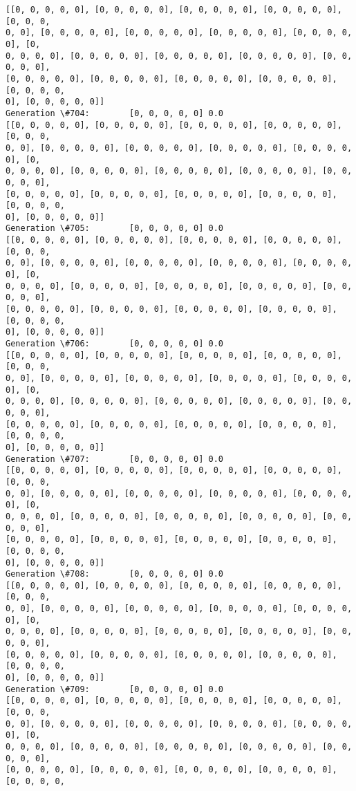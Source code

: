 \documentclass[11pt]{article}
\begin{document}
\begin{Verbatim}[commandchars=\\\{\}]
[[0, 0, 0, 0, 0], [0, 0, 0, 0, 0], [0, 0, 0, 0, 0], [0, 0, 0, 0, 0], [0, 0, 0,
0, 0], [0, 0, 0, 0, 0], [0, 0, 0, 0, 0], [0, 0, 0, 0, 0], [0, 0, 0, 0, 0], [0,
0, 0, 0, 0], [0, 0, 0, 0, 0], [0, 0, 0, 0, 0], [0, 0, 0, 0, 0], [0, 0, 0, 0, 0],
[0, 0, 0, 0, 0], [0, 0, 0, 0, 0], [0, 0, 0, 0, 0], [0, 0, 0, 0, 0], [0, 0, 0, 0,
0], [0, 0, 0, 0, 0]]
Generation \#704:        [0, 0, 0, 0, 0] 0.0
[[0, 0, 0, 0, 0], [0, 0, 0, 0, 0], [0, 0, 0, 0, 0], [0, 0, 0, 0, 0], [0, 0, 0,
0, 0], [0, 0, 0, 0, 0], [0, 0, 0, 0, 0], [0, 0, 0, 0, 0], [0, 0, 0, 0, 0], [0,
0, 0, 0, 0], [0, 0, 0, 0, 0], [0, 0, 0, 0, 0], [0, 0, 0, 0, 0], [0, 0, 0, 0, 0],
[0, 0, 0, 0, 0], [0, 0, 0, 0, 0], [0, 0, 0, 0, 0], [0, 0, 0, 0, 0], [0, 0, 0, 0,
0], [0, 0, 0, 0, 0]]
Generation \#705:        [0, 0, 0, 0, 0] 0.0
[[0, 0, 0, 0, 0], [0, 0, 0, 0, 0], [0, 0, 0, 0, 0], [0, 0, 0, 0, 0], [0, 0, 0,
0, 0], [0, 0, 0, 0, 0], [0, 0, 0, 0, 0], [0, 0, 0, 0, 0], [0, 0, 0, 0, 0], [0,
0, 0, 0, 0], [0, 0, 0, 0, 0], [0, 0, 0, 0, 0], [0, 0, 0, 0, 0], [0, 0, 0, 0, 0],
[0, 0, 0, 0, 0], [0, 0, 0, 0, 0], [0, 0, 0, 0, 0], [0, 0, 0, 0, 0], [0, 0, 0, 0,
0], [0, 0, 0, 0, 0]]
Generation \#706:        [0, 0, 0, 0, 0] 0.0
[[0, 0, 0, 0, 0], [0, 0, 0, 0, 0], [0, 0, 0, 0, 0], [0, 0, 0, 0, 0], [0, 0, 0,
0, 0], [0, 0, 0, 0, 0], [0, 0, 0, 0, 0], [0, 0, 0, 0, 0], [0, 0, 0, 0, 0], [0,
0, 0, 0, 0], [0, 0, 0, 0, 0], [0, 0, 0, 0, 0], [0, 0, 0, 0, 0], [0, 0, 0, 0, 0],
[0, 0, 0, 0, 0], [0, 0, 0, 0, 0], [0, 0, 0, 0, 0], [0, 0, 0, 0, 0], [0, 0, 0, 0,
0], [0, 0, 0, 0, 0]]
Generation \#707:        [0, 0, 0, 0, 0] 0.0
[[0, 0, 0, 0, 0], [0, 0, 0, 0, 0], [0, 0, 0, 0, 0], [0, 0, 0, 0, 0], [0, 0, 0,
0, 0], [0, 0, 0, 0, 0], [0, 0, 0, 0, 0], [0, 0, 0, 0, 0], [0, 0, 0, 0, 0], [0,
0, 0, 0, 0], [0, 0, 0, 0, 0], [0, 0, 0, 0, 0], [0, 0, 0, 0, 0], [0, 0, 0, 0, 0],
[0, 0, 0, 0, 0], [0, 0, 0, 0, 0], [0, 0, 0, 0, 0], [0, 0, 0, 0, 0], [0, 0, 0, 0,
0], [0, 0, 0, 0, 0]]
Generation \#708:        [0, 0, 0, 0, 0] 0.0
[[0, 0, 0, 0, 0], [0, 0, 0, 0, 0], [0, 0, 0, 0, 0], [0, 0, 0, 0, 0], [0, 0, 0,
0, 0], [0, 0, 0, 0, 0], [0, 0, 0, 0, 0], [0, 0, 0, 0, 0], [0, 0, 0, 0, 0], [0,
0, 0, 0, 0], [0, 0, 0, 0, 0], [0, 0, 0, 0, 0], [0, 0, 0, 0, 0], [0, 0, 0, 0, 0],
[0, 0, 0, 0, 0], [0, 0, 0, 0, 0], [0, 0, 0, 0, 0], [0, 0, 0, 0, 0], [0, 0, 0, 0,
0], [0, 0, 0, 0, 0]]
Generation \#709:        [0, 0, 0, 0, 0] 0.0
[[0, 0, 0, 0, 0], [0, 0, 0, 0, 0], [0, 0, 0, 0, 0], [0, 0, 0, 0, 0], [0, 0, 0,
0, 0], [0, 0, 0, 0, 0], [0, 0, 0, 0, 0], [0, 0, 0, 0, 0], [0, 0, 0, 0, 0], [0,
0, 0, 0, 0], [0, 0, 0, 0, 0], [0, 0, 0, 0, 0], [0, 0, 0, 0, 0], [0, 0, 0, 0, 0],
[0, 0, 0, 0, 0], [0, 0, 0, 0, 0], [0, 0, 0, 0, 0], [0, 0, 0, 0, 0], [0, 0, 0, 0,

\end{Verbatim}
\end{document}
